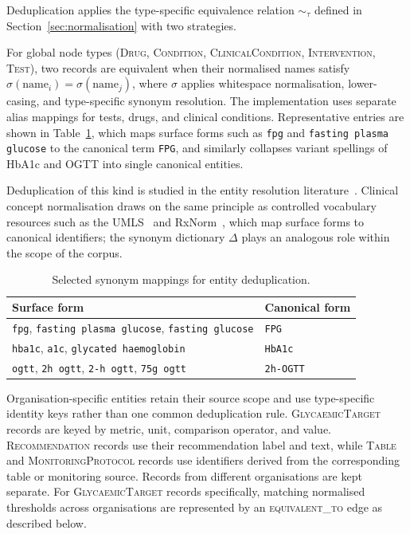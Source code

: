 Deduplication applies the type-specific equivalence relation $\sim_\tau$
defined in Section~\ref{sec:normalisation} with two strategies.

For global node types (\textsc{Drug}, \textsc{Condition},
\textsc{ClinicalCondition}, \textsc{Intervention}, \textsc{Test}), two
records are equivalent when their normalised names satisfy
$\sigma(\text{name}_i) = \sigma(\text{name}_j)$, where $\sigma$ applies whitespace normalisation, lower-casing,
and type-specific synonym resolution. The implementation uses separate
alias mappings for tests, drugs, and clinical conditions. Representative entries are shown in Table~\ref{tab:synonyms}, which maps surface
forms such as \texttt{fpg} and \texttt{fasting plasma glucose} to the canonical
term \texttt{FPG}, and similarly collapses variant spellings of HbA1c and OGTT
into single canonical entities.

Deduplication of this kind is studied in the entity resolution
literature~\cite{getoor2012,christen2012}. Clinical concept
normalisation draws on the same principle as controlled vocabulary
resources such as the UMLS~\cite{bodenreider2004} and
RxNorm~\cite{hanna2013}, which map surface forms to canonical
identifiers; the synonym dictionary $\Delta$ plays an analogous
role within the scope of the corpus.

\begin{table}[!ht]
\centering
\small
\setlength{\tabcolsep}{6pt}

\begin{tabular}{p{} p{}}
\hline
\textbf{Surface form} & \textbf{Canonical form} \\
\hline

\texttt{fpg}, \texttt{fasting plasma glucose}, \texttt{fasting glucose}
&
\texttt{FPG}
\\[2pt]

\texttt{hba1c}, \texttt{a1c}, \texttt{glycated haemoglobin}
&
\texttt{HbA1c}
\\[2pt]

\texttt{ogtt}, \texttt{2h ogtt}, \texttt{2-h ogtt},
\texttt{75g ogtt}
&
\texttt{2h-OGTT}
\\

\hline
\end{tabular}
\caption{Selected synonym mappings for entity deduplication.}
\label{tab:synonyms}
\end{table}

Organisation-specific entities retain their source scope and use type-specific
identity keys rather than one common deduplication rule.
\textsc{GlycaemicTarget} records are keyed by metric, unit, comparison
operator, and value. \textsc{Recommendation} records use their recommendation
label and text, while \textsc{Table} and \textsc{MonitoringProtocol} records
use identifiers derived from the corresponding table or monitoring source. Records from different organisations are kept separate. For \textsc{GlycaemicTarget} records specifically, matching normalised thresholds across organisations are represented by an \textsc{equivalent\_to} edge as described below. 

